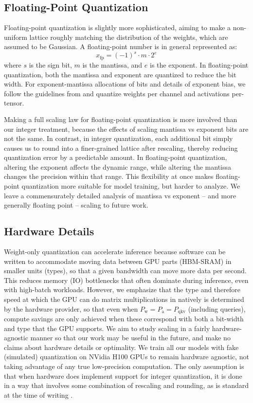 \documentclass[11pt]{article}
\begin{document}
\subsection{Floating-Point Quantization}

Floating-point quantization is slightly more sophisticated, aiming to make a non-uniform lattice roughly matching the distribution of the weights, which are assumed to be Gaussian. A floating-point number is in general represented as:
\[
x_{\text{fp}} = (-1)^s \cdot m \cdot 2^e
\]
where \( s \) is the sign bit, \( m \) is the mantissa, and \( e \) is the exponent. In floating-point quantization, both the mantissa and exponent are quantized to reduce the bit width. For exponent-mantissa allocations of bits and details of exponent bias, we follow the guidelines from \citep{micikevicius2022fp8} and quantize weights per channel and activations per-tensor. 

Making a full scaling law for floating-point quantization is more involved than our integer treatment, because the effects of scaling mantissa vs exponent bits are not the same. In contrast, in integer quantization, each additional bit simply causes us to round into a finer-grained lattice after rescaling, thereby reducing quantization error by a predictable amount. In floating-point quantization, altering the exponent affects the dynamic range, while altering the mantissa changes the precision within that range. This flexibility at once makes floating-point quantization more suitable for model training, but harder to analyze. We leave a commensurately detailed analysis of mantissa vs exponent -- and more generally floating point -- scaling to future work.

\subsection{Hardware Details}

Weight-only quantization can accelerate inference because software can be written to accommodate moving data between GPU parts (HBM-SRAM) in smaller units (types), so that a given bandwidth can move more data per second. This reduces memory (IO) bottlenecks that often dominate during inference, even with high-batch workloads. However, we emphasize that the type and therefore speed at which the GPU can do matrix multiplications in natively is determined by the hardware provider, so that even when $P_\text{w}=P_\text{a}=P_\text{qkv}$ (including queries), compute savings are only achieved when these correspond with both a bit-width and type that the GPU supports. We aim to study scaling in a fairly hardware-agnostic manner so that our work may be useful in the future, and make no claims about hardware details or optimality. We train all our models with fake (simulated) quantization on NVidia H100 GPUs to remain hardware agnostic, not taking advantage of any true low-precision computation. The only assumption is that when hardware does implement support for integer quantization, it is done in a way that involves some combination of rescaling and rounding, as is standard at the time of writing \citep{dettmers2023case, dettmers2022gpt3, wu2020integer, jacob2018quantization}. 
\end{document}
